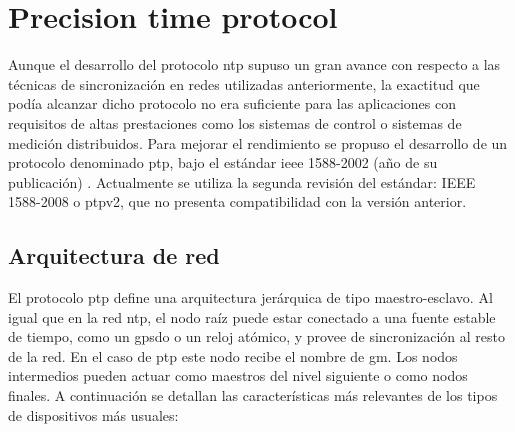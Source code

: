 \section{Precision time protocol}

Aunque el desarrollo del protocolo \gls{ntp} supuso un gran avance con respecto 
a las técnicas de sincronización en redes utilizadas anteriormente, la 
exactitud que podía alcanzar dicho protocolo no era suficiente para las 
aplicaciones con requisitos de altas prestaciones como los sistemas de control 
o sistemas de medición distribuidos. Para mejorar el rendimiento se propuso el 
desarrollo de un protocolo denominado \acrlong{ptp}, bajo el estándar 
\acrshort{ieee} 1588-2002 (año de su publicación) \cite{IEEE1588-2008}. 
Actualmente se utiliza la segunda revisión del estándar: IEEE 1588-2008 o 
\gls{ptp}v2, que no presenta compatibilidad con la versión anterior.

\subsection{Arquitectura de red}

El protocolo \gls{ptp} define una arquitectura jerárquica de tipo 
maestro-esclavo. Al igual que en la red \gls{ntp}, el nodo raíz puede estar 
conectado a una fuente estable de tiempo, como un \gls{gpsdo} o un reloj 
atómico, y provee de sincronización al resto de la red. En el caso de \gls{ptp} 
este nodo recibe el nombre de \acrlong{gm}. Los nodos intermedios pueden actuar 
como maestros del nivel siguiente o como nodos finales. A continuación se 
detallan las características más relevantes de los tipos de dispositivos más 
usuales:

